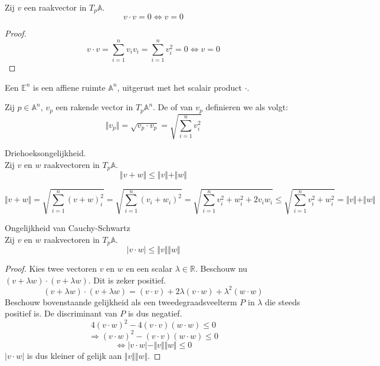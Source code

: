 \documentclass[main.tex]{subfiles}
\begin{document}
\begin{ei}
  Zij $v$ een raakvector in $T_{p}\mathbb{A}$.
  \[ v \cdot v = 0 \Leftrightarrow v = 0 \]

  \begin{proof}
    \[
    v \cdot v =  \sum_{i=1}^{n}v_{i}v_{i} = \sum_{i=1}^{n}v_{i}^{2} = 0 \Leftrightarrow v = 0
    \]
  \end{proof}
\end{ei}

\begin{de}
  Een  $\mathbb{E}^{n}$ is een affiene ruimte $\mathbb{A}^{n}$, uitgerust met het scalair product $\cdot$.
\end{de}

\begin{de}
  Zij $p\in\mathbb{A}^{n}$, $v_{p}$ een rakende vector in $T_{p}\mathbb{A}^{n}$.
  De  of  van $v_{p}$ definieren we als volgt:
  \[ \Vert v_{p} \Vert = \sqrt{v_{p} \cdot v_{p}} = \sqrt{\sum_{i=1}^{n}v_{i}^{2}} \]
\end{de}

\begin{ei}
  Driehoeksongelijkheid.\\
  Zij $v$ en $w$ raakvectoren in $T_{p}\mathbb{A}$.
  \[ \Vert v + w \Vert \le \Vert v \Vert + \Vert w \Vert \]

  \[
  \Vert v + w \Vert
  = \sqrt{\sum_{i=1}^{n}(v+w)_{i}^{2}}
  = \sqrt{\sum_{i=1}^{n}(v_{i}+w_{i})^{2}}
  = \sqrt{\sum_{i=1}^{n}v_{i}^{2}+w_{i}^{2}+ 2v_{i}w_{i}} 
  \le \sqrt{\sum_{i=1}^{n}v_{i}^{2}+w_{i}^{2}} 
  = \Vert v \Vert + \Vert w \Vert
  \]
\end{ei}

\begin{ei}
  \label{ei:ongelijkheid-van-cauchy-schwartz}
  Ongelijkheid van Cauchy-Schwartz\\
  Zij $v$ en $w$ raakvectoren in $T_{p}\mathbb{A}$.
  \[ |v \cdot w| \le \Vert v \Vert \Vert w \Vert \]

  \begin{proof}
    Kies twee vectoren $v$ en $w$ en een scalar $\lambda\in \mathbb{R}$.
    Beschouw nu $(v+\lambda w) \cdot (v + \lambda w)$.
    Dit is zeker positief.
    \[ (v+\lambda w) \cdot (v + \lambda w) = (v \cdot v) + 2 \lambda (v \cdot w) + \lambda^{2}(w \cdot w) \]
    Beschouw bovenstaande gelijkheid als een tweedegraadsveelterm $P$ in $\lambda$ die steeds positief is.
    De discriminant van $P$ is dus negatief.
    \[ 4(v \cdot w)^{2} - 4(v \cdot v)(w \cdot w) \le 0 \]
    \[ \Rightarrow  (v \cdot w)^{2} - (v \cdot v)(w \cdot w) \le 0 \]
    \[ \Leftrightarrow |v \cdot w| - \Vert v \Vert \Vert w \Vert \le 0 \]
    $|v \cdot w|$ is dus kleiner of gelijk aan $\Vert v \Vert \Vert w \Vert$.
  \end{proof}
\end{ei}
\end{document}
